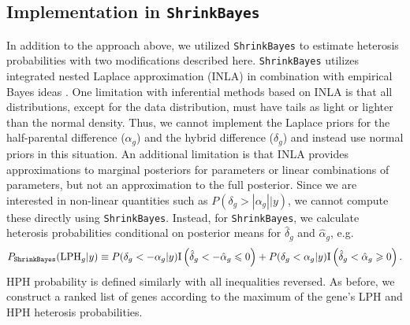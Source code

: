 \documentclass[useAMS,usenatbib,referee]{biom}
\newcommand{\ShrinkBayes}{{\tt ShrinkBayes}}
\begin{document}
\subsection{Implementation in \ShrinkBayes{}} \label{s:shrinkbayes}

In addition to the approach above, we utilized \ShrinkBayes{} to estimate heterosis probabilities with two modifications described here. \ShrinkBayes{} utilizes integrated nested Laplace approximation (INLA) \citep{rue2009approximate} in combination with empirical Bayes ideas \citep{van2014shrinkbayes}. One limitation with inferential methods based on INLA is that all distributions, except for the data distribution, must have tails as light or lighter than the normal density. Thus, we cannot implement the Laplace priors for the half-parental difference ($\alpha_g$) and the hybrid difference ($\delta_g$) and instead use normal priors in this situation. An additional limitation is that INLA provides approximations to marginal posteriors for parameters or linear combinations of parameters, but not an approximation to the full posterior. Since we are interested in non-linear quantities such as $P(\delta_g > |\alpha_g||y)$, we cannot compute these directly using \ShrinkBayes{}. Instead, for \ShrinkBayes{}, we calculate heterosis probabilities conditional on posterior means for $\hat{\delta}_g$ and $\hat{\alpha}_g$, e.g. 
\[ 
P_{\ShrinkBayes{}}(\mbox{LPH}_g|y) \equiv P(\delta_g<-\alpha_g|y)\mathrm{I}\left(\hat{\delta}_g < -\hat{\alpha}_g \le 0\right) + P(\delta_g<\alpha_g|y) \mathrm{I}\left(\hat{\delta}_g < \hat{\alpha}_g \ge 0\right).
\]
HPH probability is defined similarly with all inequalities reversed. As before, we construct a ranked list of genes according to the maximum of the gene's LPH and HPH heterosis probabilities.
\end{document}
